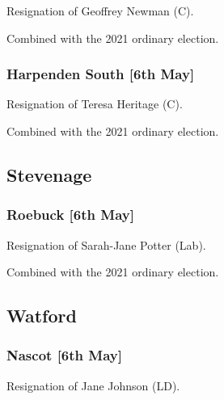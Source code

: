 \documentclass[a4paper,openany]{book}
\begin{document}
\begin{resultsiii}

Resignation of Geoffrey Newman (C).

Combined with the 2021 ordinary election.

\subsubsection*{Harpenden South \hspace*{\fill}\nolinebreak[1]%
	\enspace\hspace*{\fill}
	[6th May]}


Resignation of Teresa Heritage (C).

Combined with the 2021 ordinary election.

\subsection*{Stevenage}

\subsubsection*{Roebuck \hspace*{\fill}\nolinebreak[1]%
	\enspace\hspace*{\fill}
	[6th May]}


Resignation of Sarah-Jane Potter (Lab).

Combined with the 2021 ordinary election.

\subsection*{Watford}

\subsubsection*{Nascot \hspace*{\fill}\nolinebreak[1]%
	\enspace\hspace*{\fill}
	[6th May]}


Resignation of Jane Johnson (LD).


\end{resultsiii}
\end{document}
